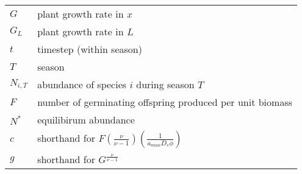 \documentclass{article}
\begin{document}
\begin{table}
\begin{tabular}{ll}
      $G$ & plant growth rate in $x$ \\
      $G_{L}$ & plant growth rate in $L$ \\
      $t$ & timestep (within season) \\
      $T$ & season \\
      $N_{i, T}$ & abundance of species $i$ during season $T$ \\
      $F$ & number of germinating offspring produced per unit biomass \\
      $N^{*}$ & equilibirum abundance \\
      $c$ & shorthand for $F(\frac{\nu}{\nu-1})(\frac{1}{a_{max}D_{s}\phi})$ \\
      $g$ & shorthand for $G^{\frac{\nu}{\nu-1}}$ \\
      \bottomrule
    \end{tabular}
  \end{table} 
\end{document}
